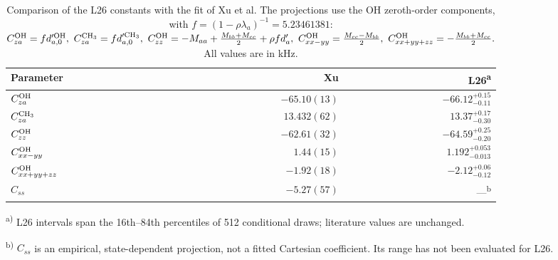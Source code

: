 \begin{table}
\begingroup
\caption{Comparison of the L26 constants with
the fit of Xu et al.\cite{Xu2019}
The projections use the OH zeroth-order components, with $f=(1-\rho\lambda_a)^{-1}=5.23461381$:
$C_{za}^{\rm OH} = f d^{\prime\rm OH}_{a,0},\
C_{za}^{\rm CH_3} = f d^{\prime\rm CH_3}_{a,0},\
C_{zz}^{\rm OH} =
-M_{aa}+\frac{M_{bb}+M_{cc}}{2}+\rho f d'_a,\
C_{xx-yy}^{\rm OH} = \frac{M_{cc}-M_{bb}}{2},\
C_{xx+yy+zz}^{\rm OH} = -\frac{M_{bb}+M_{cc}}{2}.$
All values are in kHz.}
\label{tab:xu-combinations}
\centering\small
\begingroup\setlength{\tabcolsep}{7pt}\renewcommand{\arraystretch}{1.3}
\begin{tabular}{@{}lrr@{}}
\toprule
Parameter & Xu & L26\textsuperscript{a}\\
\midrule
$C_{za}^{\rm OH}$ & $-65.10(13)$ & ${-66.12}_{-0.11}^{+0.15}$\\
$C_{za}^{\rm CH_3}$ & $13.432(62)$ & ${13.37}_{-0.30}^{+0.17}$\\
$C_{zz}^{\rm OH}$ & $-62.61(32)$ & ${-64.59}_{-0.20}^{+0.25}$\\
$C_{xx-yy}^{\rm OH}$ & $1.44(15)$ & ${1.192}_{-0.013}^{+0.053}$\\
$C_{xx+yy+zz}^{\rm OH}$ & $-1.92(18)$ & ${-2.12}_{-0.12}^{+0.06}$\\
$C_{ss}$ & $-5.27(57)$ & ---\textsuperscript{b}\\
\bottomrule
\end{tabular}\endgroup
\par\vspace{3pt}
\par\vspace{3pt}\begin{minipage}{\linewidth}\footnotesize\raggedright\textsuperscript{a)} L26 intervals span the 16th--84th percentiles of 512 conditional draws; literature values are unchanged.\par\textsuperscript{b)} $C_{ss}$ is an empirical, state-dependent projection, not a fitted Cartesian coefficient. Its range has not been evaluated for L26.\end{minipage}
\par\endgroup
\end{table}
